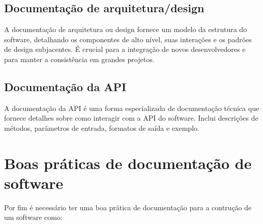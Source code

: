 \documentclass[12pt,oneside,a4paper,article]{abntex2}
\begin{document}
\subsection{Documentação de arquitetura/design}
A documentação de arquitetura ou design fornece um
modelo da estrutura do software, detalhando os componentes de alto nível, suas interações e os
padrões de design subjacentes. É crucial para a integração de novos desenvolvedores e para manter
a consistência em grandes projetos.

\subsection{Documentação da API}A documentação da API é uma forma especializada de documentação
técnica que fornece detalhes sobre como interagir com a API do software. Inclui descrições de
métodos, parâmetros de entrada, formatos de saída e exemplo.

\section{Boas práticas de documentação de software}
Por fim é necessário ter uma boa prática de documentação para a contrução de um software como:
\end{document}
